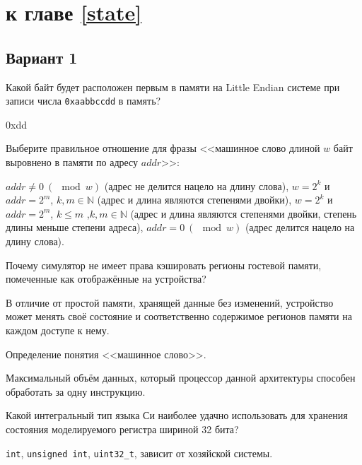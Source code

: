 
\section{\Questions к главе \ref{state}} %

\subsection*{Вариант 1}

\begin{questions}

\question[3] Какой байт будет расположен первым в памяти на Little Endian системе при записи числа \texttt{0xaabbccdd} в память?
\begin{solution}[1cm]
0xdd
\end{solution}

\question[3] Выберите правильное отношение для фразы <<машинное слово длиной $w$ байт выровнено в памяти по адресу $addr$>>:
\begin{choices}
    \choice $addr \neq 0\ (\mod w)$ (адрес не делится нацело на длину слова),
    \choice $w = 2^k$ и $addr = 2^m$, $k,m \in \mathbb{N}$ (адрес и длина являются степенями двойки),
    \choice $w = 2^k$ и $addr = 2^m$, $k \leq m $ ,$k,m \in \mathbb{N}$ (адрес и длина являются степенями двойки, степень длины меньше степени адреса),
    \correctchoice $addr = 0\ (\mod w)$ (адрес делится нацело на длину слова).
\end{choices}

\question[3] Почему симулятор не имеет права кэшировать регионы гостевой памяти, помеченные как отображённые на устройства?
\begin{solution}[2cm]
В отличие от простой памяти, хранящей данные без изменений, устройство может менять своё состояние и соответственно содержимое регионов памяти на каждом доступе к нему.
\end{solution}

\question[3] Определение понятия <<машинное слово>>.
\begin{solution}[1cm]
Максимальный объём данных, который процессор данной архитектуры способен обработать за одну инструкцию. 
\end{solution}

\question[3] Какой интегральный тип языка Си наиболее удачно использовать для хранения состояния моделируемого регистра шириной 32 бита?
\begin{choices}
    \choice \texttt{int},
    \choice \texttt{unsigned int},
    \correctchoice \texttt{uint32_t},
    \choice зависит от хозяйской системы.
\end{choices}

\end{questions}

